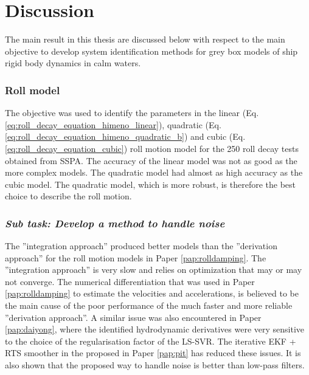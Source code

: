 \section{Discussion}
The main result in this thesis are discussed below with respect to the main objective to develop system identification methods for grey box models of ship rigid body dynamics in calm waters.

\subsubsection*{Roll model}
The objective was used to identify the parameters in the linear (Eq.\ref{eq:roll_decay_equation_himeno_linear}), quadratic (Eq.\ref{eq:roll_decay_equation_himeno_quadratic_b}) and cubic (Eq.\ref{eq:roll_decay_equation_cubic}) roll motion model for the 250 roll decay tests obtained from SSPA. 
The accuracy of the linear model was not as good as the more complex models. The quadratic model had almost as high accuracy as the cubic model. The quadratic model, which is more robust, is therefore the best choice to describe the roll motion. 

\subsubsection*{\emph{Sub task: Develop a method to handle noise}}
The  ''integration approach'' produced better models than the ''derivation approach'' for the roll motion models in Paper \ref{pap:rolldamping}. The ''integration approach'' is very slow and relies on optimization that may or may not converge.
The numerical differentiation that was used in Paper \ref{pap:rolldamping} to estimate the velocities and accelerations, is believed to be the main cause of the poor performance of the much faster and more reliable ''derivation approach''. A similar issue was also encountered in Paper \ref{pap:daiyong}, where the identified hydrodynamic derivatives were very sensitive to the choice of the regularisation factor of the LS-SVR.
The iterative EKF + RTS smoother in the proposed  in Paper \ref{pap:pit} has reduced these issues. It is also shown that the proposed way to handle noise is better than low-pass filters.

